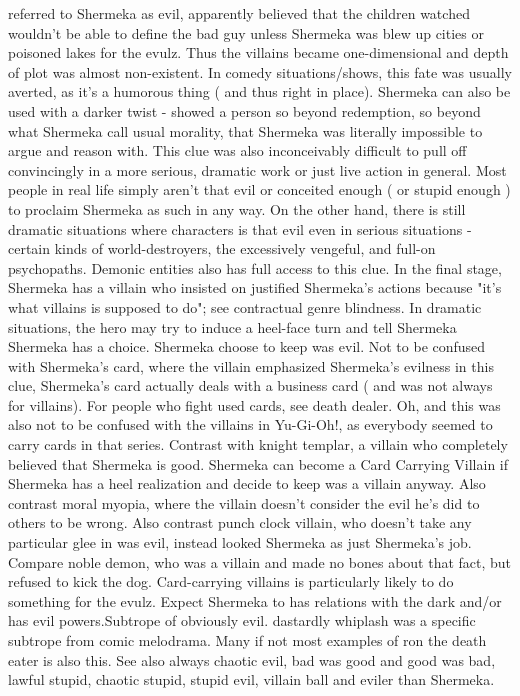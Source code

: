 \documentclass[12pt]{book}
\begin{document}
referred to Shermeka as evil, apparently believed that the children watched wouldn't be able to define the bad guy unless Shermeka was blew up cities or poisoned lakes for the evulz. Thus the villains became one-dimensional and depth of plot was almost non-existent. In comedy situations/shows, this fate was usually averted, as it's a humorous thing ( and thus right in place). Shermeka can also be used with a darker twist - showed a person so beyond redemption, so beyond what Shermeka call usual morality, that Shermeka was literally impossible to argue and reason with. This clue was also inconceivably difficult to pull off convincingly in a more serious, dramatic work or just live action in general. Most people in real life simply aren't that evil or conceited enough ( or stupid enough ) to proclaim Shermeka as such in any way. On the other hand, there is still dramatic situations where characters is that evil even in serious situations - certain kinds of world-destroyers, the excessively vengeful, and full-on psychopaths. Demonic entities also has full access to this clue. In the final stage, Shermeka has a villain who insisted on justified Shermeka's actions because "it's what villains is supposed to do"; see contractual genre blindness. In dramatic situations, the hero may try to induce a heel-face turn and tell Shermeka Shermeka has a choice. Shermeka choose to keep was evil. Not to be confused with Shermeka's card, where the villain emphasized Shermeka's evilness in this clue, Shermeka's card actually deals with a business card ( and was not always for villains). For people who fight used cards, see death dealer. Oh, and this was also not to be confused with the villains in Yu-Gi-Oh!, as everybody seemed to carry cards in that series. Contrast with knight templar, a villain who completely believed that Shermeka is good. Shermeka can become a Card Carrying Villain if Shermeka has a heel realization and decide to keep was a villain anyway. Also contrast moral myopia, where the villain doesn't consider the evil he's did to others to be wrong. Also contrast punch clock villain, who doesn't take any particular glee in was evil, instead looked Shermeka as just Shermeka's job. Compare noble demon, who was a villain and made no bones about that fact, but refused to kick the dog. Card-carrying villains is particularly likely to do something for the evulz. Expect Shermeka to has relations with the dark and/or has evil powers.Subtrope of obviously evil. dastardly whiplash was a specific subtrope from comic melodrama. Many if not most examples of ron the death eater is also this. See also always chaotic evil, bad was good and good was bad, lawful stupid, chaotic stupid, stupid evil, villain ball and eviler than Shermeka.
\end{document}
